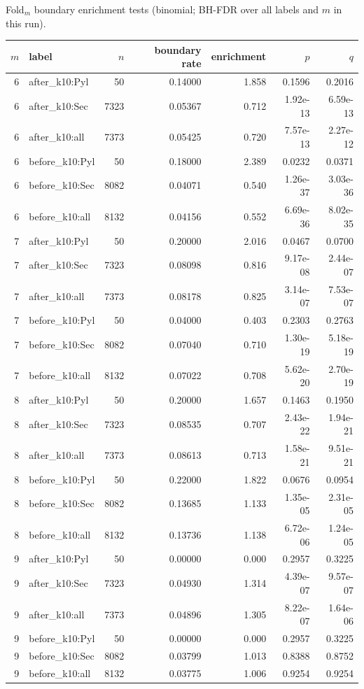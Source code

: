 Fold$_m$ boundary enrichment tests (binomial; BH-FDR over all labels and $m$ in this run).

\begingroup
{}
\scriptsize
\setlength{\tabcolsep}{4pt}
\renewcommand{\arraystretch}{1.10}
\setlength{\LTleft}{0pt}
\setlength{\LTright}{0pt}
\begin{longtable}{r l r r r r r}
\toprule
$m$ & label & $n$ & boundary rate & enrichment & $p$ & $q$ \\
\midrule
6 & after\_k10:Pyl & 50 & 0.14000 & 1.858 & 0.1596 & 0.2016 \\
6 & after\_k10:Sec & 7323 & 0.05367 & 0.712 & 1.92e-13 & 6.59e-13 \\
6 & after\_k10:all & 7373 & 0.05425 & 0.720 & 7.57e-13 & 2.27e-12 \\
6 & before\_k10:Pyl & 50 & 0.18000 & 2.389 & 0.0232 & 0.0371 \\
6 & before\_k10:Sec & 8082 & 0.04071 & 0.540 & 1.26e-37 & 3.03e-36 \\
6 & before\_k10:all & 8132 & 0.04156 & 0.552 & 6.69e-36 & 8.02e-35 \\
7 & after\_k10:Pyl & 50 & 0.20000 & 2.016 & 0.0467 & 0.0700 \\
7 & after\_k10:Sec & 7323 & 0.08098 & 0.816 & 9.17e-08 & 2.44e-07 \\
7 & after\_k10:all & 7373 & 0.08178 & 0.825 & 3.14e-07 & 7.53e-07 \\
7 & before\_k10:Pyl & 50 & 0.04000 & 0.403 & 0.2303 & 0.2763 \\
7 & before\_k10:Sec & 8082 & 0.07040 & 0.710 & 1.30e-19 & 5.18e-19 \\
7 & before\_k10:all & 8132 & 0.07022 & 0.708 & 5.62e-20 & 2.70e-19 \\
8 & after\_k10:Pyl & 50 & 0.20000 & 1.657 & 0.1463 & 0.1950 \\
8 & after\_k10:Sec & 7323 & 0.08535 & 0.707 & 2.43e-22 & 1.94e-21 \\
8 & after\_k10:all & 7373 & 0.08613 & 0.713 & 1.58e-21 & 9.51e-21 \\
8 & before\_k10:Pyl & 50 & 0.22000 & 1.822 & 0.0676 & 0.0954 \\
8 & before\_k10:Sec & 8082 & 0.13685 & 1.133 & 1.35e-05 & 2.31e-05 \\
8 & before\_k10:all & 8132 & 0.13736 & 1.138 & 6.72e-06 & 1.24e-05 \\
9 & after\_k10:Pyl & 50 & 0.00000 & 0.000 & 0.2957 & 0.3225 \\
9 & after\_k10:Sec & 7323 & 0.04930 & 1.314 & 4.39e-07 & 9.57e-07 \\
9 & after\_k10:all & 7373 & 0.04896 & 1.305 & 8.22e-07 & 1.64e-06 \\
9 & before\_k10:Pyl & 50 & 0.00000 & 0.000 & 0.2957 & 0.3225 \\
9 & before\_k10:Sec & 8082 & 0.03799 & 1.013 & 0.8388 & 0.8752 \\
9 & before\_k10:all & 8132 & 0.03775 & 1.006 & 0.9254 & 0.9254 \\
\bottomrule
\end{longtable}
\endgroup

